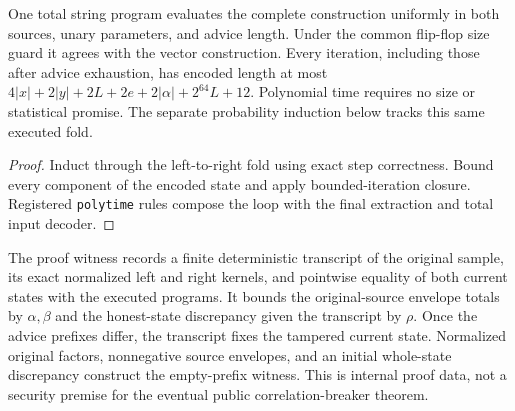 \begin{theorem}
  \label{thm:lowerbounds-algebraic-advice-program}
  \leanok
  One total string program evaluates the complete construction uniformly
  in both sources, unary parameters, and advice length. Under the common
  flip-flop size guard it agrees with the vector construction. Every
  iteration, including those after advice exhaustion, has encoded length
  at most
  $4|x|+2|y|+2L+2e+2|\alpha|+2^{64}L+12$.
  Polynomial time requires no size or statistical promise. The separate
  probability induction below tracks this same executed fold.
\end{theorem}
\begin{proof}
  \leanok
  Induct through the left-to-right fold using exact step correctness.
  Bound every component of the encoded state and apply bounded-iteration
  closure. Registered \texttt{polytime} rules compose the loop with the
  final extraction and total input decoder.
\end{proof}

\begin{definition}
  \label{def:lowerbounds-algebraic-advice-invariant}
  \leanok
  The proof witness records a finite deterministic transcript of the
  original sample, its exact normalized left and right kernels, and
  pointwise equality of both current states with the executed programs.
  It bounds the original-source envelope totals by $\alpha,\beta$ and
  the honest-state discrepancy given the transcript by $\rho$.
  Once the advice prefixes differ, the transcript fixes the tampered
  current state. Normalized original factors, nonnegative source envelopes,
  and an initial whole-state discrepancy construct the empty-prefix witness.
  This is internal proof data, not a security premise for the eventual
  public correlation-breaker theorem.
\end{definition}

